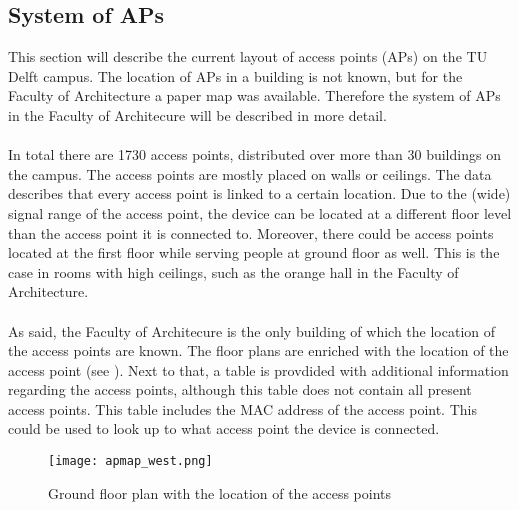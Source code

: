 \subsection{System of APs}\label{systemofaps}
This section will describe the current layout of access points (APs) on the TU Delft campus. The location of APs in a building is not known, but for the Faculty of Architecture a paper map was available. Therefore the system of APs in the Faculty of Architecure will be described in more detail. \\\\
In total there are 1730 access points, distributed over more than 30 buildings on the campus. The access points are mostly placed on walls or ceilings. The data describes that every access point is linked to a certain location. Due to the (wide) signal range of the access point, the device can be located at a different floor level than the access point it is connected to. Moreover, there could be access points located at the first floor while serving people at ground floor as well. This is the case in rooms with high ceilings, such as the orange hall in the Faculty of Architecture. \\\\
As said, the Faculty of Architecure is the only building of which the location of the access points are known. The floor plans are enriched with the location of the access point (see ). Next to that, a table is provdided with additional information regarding the access points, although this table does not contain all present access points. This table includes the MAC address of the access point. This could be used to look up to what access point the device is connected. 
\begin{figure}[H]
	\centering
	\texttt{[image: apmap\_west.png]}
	\captionsetup{justification=centering}
	\caption{Ground floor plan with the location of the access points}
	\label{apmap_west}
\end{figure}


